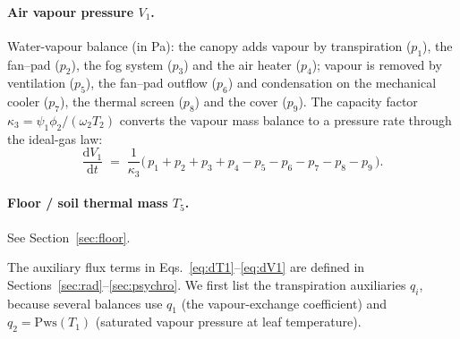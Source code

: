 \documentclass[11pt,a4paper]{article}
\newcommand{\dd}[2]{\frac{\mathrm{d}#1}{\mathrm{d}#2}}
\newcommand{\Tcan}{T_{1}}
\newcommand{\Tair}{T_{2}}
\newcommand{\Vair}{V_{1}}
\newcommand{\Tflo}{T_{5}}
\begin{document}
\paragraph{Air vapour pressure $\Vair$.} Water-vapour balance (in \si{Pa}): the canopy adds vapour
by transpiration ($p_1$), the fan--pad ($p_2$), the fog system ($p_3$) and the air heater ($p_4$);
vapour is removed by ventilation ($p_5$), the fan--pad outflow ($p_6$) and condensation on the
mechanical cooler ($p_7$), the thermal screen ($p_8$) and the cover ($p_9$). The capacity factor
$\kappa_3=\psi_1\phi_2/(\omega_2 \Tair)$ converts the vapour mass balance to a pressure rate through
the ideal-gas law:
\begin{equation}
  \dd{\Vair}{t} \;=\; \frac{1}{\kappa_3}
     \Big(\,p_1 + p_2 + p_3 + p_4 - p_5 - p_6 - p_7 - p_8 - p_9\,\Big).
  \label{eq:dV1}
\end{equation}

\paragraph{Floor / soil thermal mass $\Tflo$.} See Section~\ref{sec:floor}.

\medskip
The auxiliary flux terms in Eqs.~\eqref{eq:dT1}--\eqref{eq:dV1} are defined in
Sections~\ref{sec:rad}--\ref{sec:psychro}. We first list the transpiration auxiliaries $q_i$,
because several balances use $q_1$ (the vapour-exchange coefficient) and $q_2=\mathrm{Pws}(\Tcan)$
(saturated vapour pressure at leaf temperature).
\end{document}
